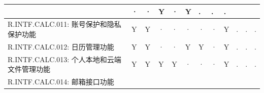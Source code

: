 \begin{table}[htbp]
\begin{tabular}{|p{9em}|p{2em}|p{2em}|p{2em}|p{2em}|p{2em}|
                            p{2em}|p{2em}|p{2em}|p{2em}|p{2em}|p{2em}|}
                & ·                     & ·                 & Y 
                & ·                     & Y                 & .
                & .                     & . \\
            \hline %
            R.INTF.CALC.011: 账号保护和隐私保护功能
                & Y                     & Y                 & · 
                & ·                     & ·                 & · 
                & ·                     & Y                 & .
                & .                     & . \\
            \hline %
            R.INTF.CALC.012: 日历管理功能
                & Y                     & Y                 & · 
                & ·                     & Y                 & Y 
                & ·                     & Y                 & .
                & .                     & . \\
            \hline %
            R.INTF.CALC.013: 个人本地和云端文件管理功能
                & Y                     & Y                 & Y 
                & Y                     & ·                 & · 
                & ·                     & Y                 & .
                & .                     & . \\
            \hline %
            R.INTF.CALC.014: 邮箱接口功能

\end{tabular}
\end{table}

